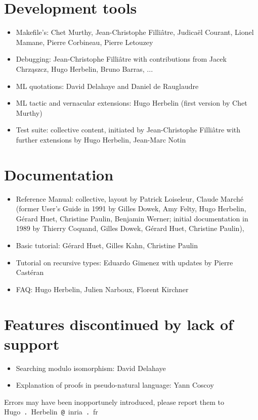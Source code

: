 \documentclass{article}
\begin{document}
\section{Development tools}

\begin{itemize}
\item Makefile's: Chet Murthy, Jean-Christophe Filliâtre, Judicaël
  Courant, Lionel Mamane, Pierre Corbineau, Pierre Letouzey
\item Debugging: Jean-Christophe Filliâtre with contributions from Jacek Chrz\k{a}szcz, Hugo Herbelin, Bruno Barras, ...
\item ML quotations: David Delahaye and Daniel de Rauglaudre
\item ML tactic and vernacular extensions: Hugo Herbelin (first version by Chet Murthy)
\item Test suite: collective content, initiated by Jean-Christophe Filliâtre with further extensions by Hugo Herbelin, Jean-Marc Notin
\end{itemize}

\section{Documentation}

\begin{itemize}

\item Reference Manual: collective, layout by Patrick Loiseleur,
  Claude Marché (former User's Guide in 1991 by Gilles Dowek, Amy
  Felty, Hugo Herbelin, Gérard Huet, Christine Paulin, Benjamin
  Werner; initial documentation in 1989 by Thierry Coquand, Gilles
  Dowek, Gérard Huet, Christine Paulin),
\item Basic tutorial: Gérard Huet, Gilles Kahn, Christine Paulin
\item Tutorial on recursive types: Eduardo Gimenez with updates by Pierre Castéran
\item FAQ: Hugo Herbelin, Julien Narboux, Florent Kirchner
\end{itemize}

\section{Features discontinued by lack of support}

\begin{itemize}
\item Searching modulo isomorphism: David Delahaye
\item Explanation of proofs in pseudo-natural language: Yann Coscoy
\end{itemize}

Errors may have been inopportunely introduced, please report them to Hugo~\verb=.=~Herbelin~\verb=@=~inria~\verb=.=~fr
\end{document}
